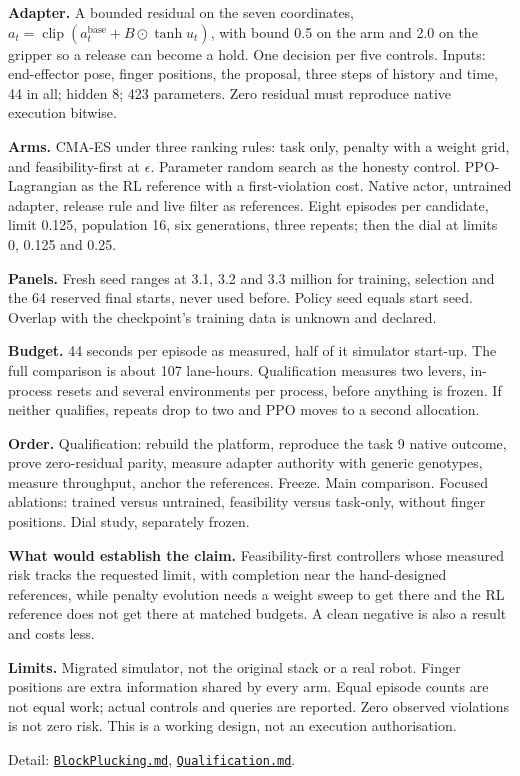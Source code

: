 \documentclass[11pt,a4paper]{article}
\begin{document}
\textbf{Adapter.} A bounded residual on the seven coordinates,
$a_t=\operatorname{clip}(a_t^{\mathrm{base}}+B\odot\tanh u_t)$, with bound 0.5 on
the arm and 2.0 on the gripper so a release can become a hold. One decision per
five controls. Inputs: end-effector pose, finger positions, the proposal, three
steps of history and time, 44 in all; hidden 8; 423 parameters. Zero residual
must reproduce native execution bitwise.

\textbf{Arms.} CMA-ES under three ranking rules: task only, penalty with a weight
grid, and feasibility-first at $\epsilon$. Parameter random search as the honesty
control. PPO-Lagrangian as the RL reference with a first-violation cost. Native
actor, untrained adapter, release rule and live filter as references. Eight
episodes per candidate, limit 0.125, population 16, six generations, three
repeats; then the dial at limits 0, 0.125 and 0.25.

\textbf{Panels.} Fresh seed ranges at 3.1, 3.2 and 3.3 million for training,
selection and the 64 reserved final starts, never used before. Policy seed equals
start seed. Overlap with the checkpoint's training data is unknown and declared.

\textbf{Budget.} 44 seconds per episode as measured, half of it simulator start-up.
The full comparison is about 107 lane-hours. Qualification measures two levers,
in-process resets and several environments per process, before anything is
frozen. If neither qualifies, repeats drop to two and PPO moves to a second
allocation.

\textbf{Order.} Qualification: rebuild the platform, reproduce the task 9 native
outcome, prove zero-residual parity, measure adapter authority with generic
genotypes, measure throughput, anchor the references. Freeze. Main comparison.
Focused ablations: trained versus untrained, feasibility versus task-only,
without finger positions. Dial study, separately frozen.

\textbf{What would establish the claim.} Feasibility-first controllers whose
measured risk tracks the requested limit, with completion near the hand-designed
references, while penalty evolution needs a weight sweep to get there and the RL
reference does not get there at matched budgets. A clean negative is also a
result and costs less.

\textbf{Limits.} Migrated simulator, not the original stack or a real robot.
Finger positions are extra information shared by every arm. Equal episode counts
are not equal work; actual controls and queries are reported. Zero observed
violations is not zero risk. This is a working design, not an execution
authorisation.

{\small Detail: \href{BlockPlucking.md}{\texttt{BlockPlucking.md}},
\href{Qualification.md}{\texttt{Qualification.md}}.}
\end{document}
